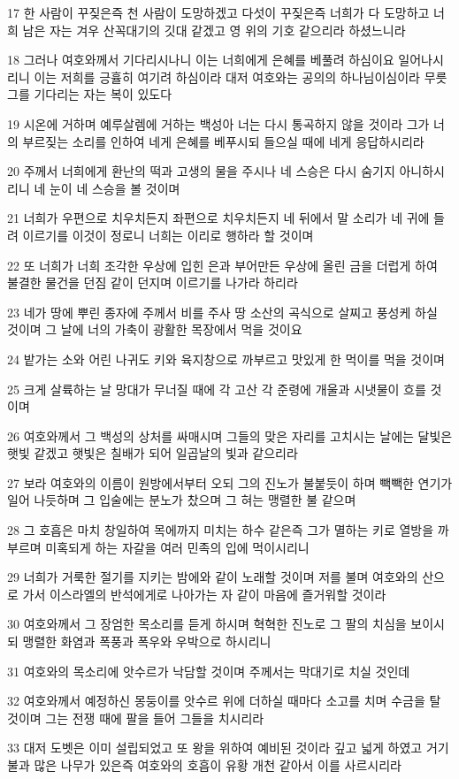 \par 17 한 사람이 꾸짖은즉 천 사람이 도망하겠고 다섯이 꾸짖은즉 너희가 다 도망하고 너희 남은 자는 겨우 산꼭대기의 깃대 같겠고 영 위의 기호 같으리라 하셨느니라
\par 18 그러나 여호와께서 기다리시나니 이는 너희에게 은혜를 베풀려 하심이요 일어나시리니 이는 저희를 긍휼히 여기려 하심이라 대저 여호와는 공의의 하나님이심이라 무릇 그를 기다리는 자는 복이 있도다
\par 19 시온에 거하며 예루살렘에 거하는 백성아 너는 다시 통곡하지 않을 것이라 그가 너의 부르짖는 소리를 인하여 네게 은혜를 베푸시되 들으실 때에 네게 응답하시리라
\par 20 주께서 너희에게 환난의 떡과 고생의 물을 주시나 네 스승은 다시 숨기지 아니하시리니 네 눈이 네 스승을 볼 것이며
\par 21 너희가 우편으로 치우치든지 좌편으로 치우치든지 네 뒤에서 말 소리가 네 귀에 들려 이르기를 이것이 정로니 너희는 이리로 행하라 할 것이며
\par 22 또 너희가 너희 조각한 우상에 입힌 은과 부어만든 우상에 올린 금을 더럽게 하여 불결한 물건을 던짐 같이 던지며 이르기를 나가라 하리라
\par 23 네가 땅에 뿌린 종자에 주께서 비를 주사 땅 소산의 곡식으로 살찌고 풍성케 하실 것이며 그 날에 너의 가축이 광활한 목장에서 먹을 것이요
\par 24 밭가는 소와 어린 나귀도 키와 육지창으로 까부르고 맛있게 한 먹이를 먹을 것이며
\par 25 크게 살륙하는 날 망대가 무너질 때에 각 고산 각 준령에 개울과 시냇물이 흐를 것이며
\par 26 여호와께서 그 백성의 상처를 싸매시며 그들의 맞은 자리를 고치시는 날에는 달빛은 햇빛 같겠고 햇빛은 칠배가 되어 일곱날의 빛과 같으리라
\par 27 보라 여호와의 이름이 원방에서부터 오되 그의 진노가 불붙듯이 하며 빽빽한 연기가 일어 나듯하며 그 입술에는 분노가 찼으며 그 혀는 맹렬한 불 같으며
\par 28 그 호흡은 마치 창일하여 목에까지 미치는 하수 같은즉 그가 멸하는 키로 열방을 까부르며 미혹되게 하는 자갈을 여러 민족의 입에 먹이시리니
\par 29 너희가 거룩한 절기를 지키는 밤에와 같이 노래할 것이며 저를 불며 여호와의 산으로 가서 이스라엘의 반석에게로 나아가는 자 같이 마음에 즐거워할 것이라
\par 30 여호와께서 그 장엄한 목소리를 듣게 하시며 혁혁한 진노로 그 팔의 치심을 보이시되 맹렬한 화염과 폭풍과 폭우와 우박으로 하시리니
\par 31 여호와의 목소리에 앗수르가 낙담할 것이며 주께서는 막대기로 치실 것인데
\par 32 여호와께서 예정하신 몽둥이를 앗수르 위에 더하실 때마다 소고를 치며 수금을 탈 것이며 그는 전쟁 때에 팔을 들어 그들을 치시리라
\par 33 대저 도벳은 이미 설립되었고 또 왕을 위하여 예비된 것이라 깊고 넓게 하였고 거기 불과 많은 나무가 있은즉 여호와의 호흡이 유황 개천 같아서 이를 사르시리라

